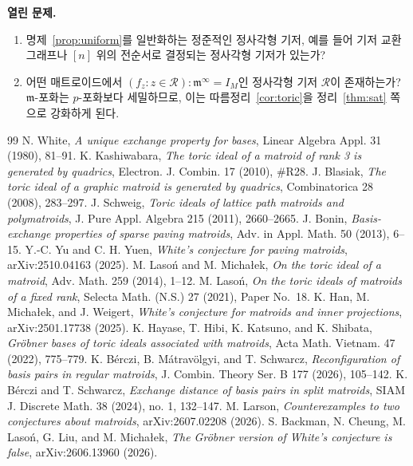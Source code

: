\documentclass[11pt,a4paper]{article}
\newcommand{\lstroke}{{\lmfont ł}}
\theoremstyle{plain}
\theoremstyle{definition}
\begin{document}
\medskip\noindent\textbf{열린 문제.}
\begin{enumerate}[label=(\arabic*),itemsep=2pt]
\item 명제~\ref{prop:uniform}를 일반화하는 정준적인 정사각형 기저, 예를 들어 기저 교환 그래프나 $[n]$ 위의 전순서로 결정되는 정사각형 기저가 있는가?
\item 어떤 매트로이드에서 $(f_z:z\in\mathcal R):\mathfrak m^\infty=I_M$인 정사각형 기저 $\mathcal R$이 존재하는가? $\mathfrak m$\nobreakdash-포화는 $p$\nobreakdash-포화보다 세밀하므로, 이는 따름정리~\ref{cor:toric}을 정리~\ref{thm:sat} 쪽으로 강화하게 된다.
\end{enumerate}

\begin{thebibliography}{99}
 N. White, \emph{A unique exchange property for bases}, Linear Algebra Appl. 31 (1980), 81--91.
 K. Kashiwabara, \emph{The toric ideal of a matroid of rank 3 is generated by quadrics}, Electron. J. Combin. 17 (2010), \#R28.
 J. Blasiak, \emph{The toric ideal of a graphic matroid is generated by quadrics}, Combinatorica 28 (2008), 283--297.
 J. Schweig, \emph{Toric ideals of lattice path matroids and polymatroids}, J. Pure Appl. Algebra 215 (2011), 2660--2665.
 J. Bonin, \emph{Basis-exchange properties of sparse paving matroids}, Adv. in Appl. Math. 50 (2013), 6--15.
 Y.-C. Yu and C. H. Yuen, \emph{White's conjecture for paving matroids}, arXiv:2510.04163 (2025).
 M. Lasoń and M. Micha\lstroke{}ek, \emph{On the toric ideal of a matroid}, Adv. Math. 259 (2014), 1--12.
 M. Lasoń, \emph{On the toric ideals of matroids of a fixed rank}, Selecta Math. (N.S.) 27 (2021), Paper No.~18.
 K. Han, M. Micha\lstroke{}ek, and J. Weigert, \emph{White's conjecture for matroids and inner projections}, arXiv:2501.17738 (2025).
 K. Hayase, T. Hibi, K. Katsuno, and K. Shibata, \emph{Gröbner bases of toric ideals associated with matroids}, Acta Math. Vietnam. 47 (2022), 775--779.
 K. Bérczi, B. Mátravölgyi, and T. Schwarcz, \emph{Reconfiguration of basis pairs in regular matroids}, J. Combin. Theory Ser. B 177 (2026), 105--142.
 K. Bérczi and T. Schwarcz, \emph{Exchange distance of basis pairs in split matroids}, SIAM J. Discrete Math. 38 (2024), no. 1, 132--147.
 M. Larson, \emph{Counterexamples to two conjectures about matroids}, arXiv:2607.02208 (2026).
 S. Backman, N. Cheung, M. Lasoń, G. Liu, and M. Micha\lstroke{}ek, \emph{The Gröbner version of White's conjecture is false}, arXiv:2606.13960 (2026).

\end{thebibliography}
\end{document}

